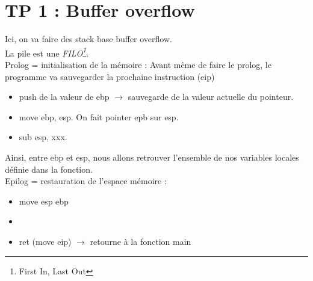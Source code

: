 \section{TP 1 : Buffer overflow}
Ici, on va faire des stack base buffer overflow.\\
La pile est une \textit{FILO\footnote{First In, Last Out}}.\\
Prolog = initialisation de la mémoire :
Avant même de faire le prolog, le programme va sauvegarder la prochaine instruction (eip)
\begin{itemize}
 \item push de la valeur de ebp $\rightarrow$ sauvegarde de la valeur actuelle du pointeur.
 \item move ebp, esp. On fait pointer epb sur esp.
 \item sub esp, xxx. 
\end{itemize}
Ainsi, entre ebp et esp, nous allons retrouver l'ensemble de nos variables locales définie dans la fonction.\\
Epilog = restauration de l'espace mémoire :
\begin{itemize}
 \item move esp ebp
 \item 
 \item ret (move eip) $\rightarrow$ retourne à la fonction main
\end{itemize}
